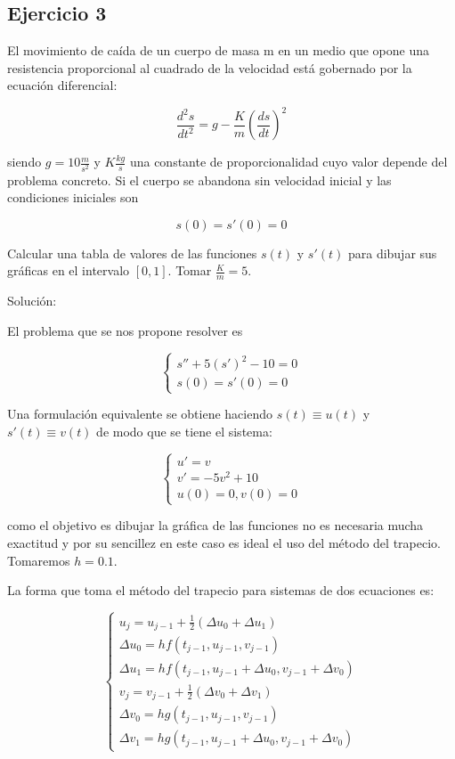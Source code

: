 \documentclass{article}
\theoremstyle{theorem-style}  %
\theoremstyle{definition-style}
\theoremstyle{example-style}
\begin{document}
\subsection{Ejercicio 3} \label{ejtp3}
El movimiento de caída de un cuerpo de masa m en un medio que opone una resistencia proporcional al cuadrado de la velocidad está gobernado por la ecuación diferencial:

\begin{equation}
\frac{d^2s}{dt^2}=g-\frac{K}{m}(\frac{ds}{dt})^2
\end{equation}

siendo $g=10 \frac{m}{s^2}$ y $K \frac{kg}{s}$ una constante de proporcionalidad cuyo valor depende del problema concreto. Si el cuerpo se abandona sin velocidad inicial y las condiciones iniciales son


\begin{equation}
s(0)=s'(0)=0
\end{equation}

Calcular una tabla de valores de las funciones $s(t)$ y $s'(t)$ para dibujar sus gráficas en el intervalo $[0,1]$. Tomar $\frac{K}{m}=5$.

Solución:

El problema que se nos propone resolver es

	\begin{equation*}
		\begin{cases}
			s''+5(s')^2-10=0 \\
			s(0)=s'(0)=0
		\end{cases}
	\end{equation*}

Una formulación equivalente se obtiene haciendo $s(t) \equiv u(t)$ y $s'(t) \equiv v(t)$ de modo que se tiene el sistema:

	\begin{equation*}
		\begin{cases}
			u'=v \\
			v'=-5v^2+10 \\
			u(0)=0,v(0)=0
		\end{cases}
	\end{equation*}

como el objetivo es dibujar la gráfica de las funciones no es necesaria mucha exactitud y por su sencillez en este caso es ideal el uso del método del trapecio. Tomaremos $h = 0.1$.

La forma que toma el método del trapecio para sistemas de dos ecuaciones es:

	\begin{equation*}
		\begin{cases}
			u_j=u_{j-1}+\frac{1}{2}(\Delta u_0+\Delta u_1) \\
			\Delta u_0 = hf(t_{j-1},u_{j-1},v_{j-1}) \\
			\Delta u_1 = hf(t_{j-1},u_{j-1}+\Delta u_0,v_{j-1}+\Delta v_0) \\
			v_j=v_{j-1}+\frac{1}{2}(\Delta v_0+\Delta v_1) \\
			\Delta v_0 = hg(t_{j-1},u_{j-1},v_{j-1}) \\
			\Delta v_1 = hg(t_{j-1},u_{j-1}+\Delta u_0,v_{j-1}+\Delta v_0)
		\end{cases}
	\end{equation*}
\end{document}
